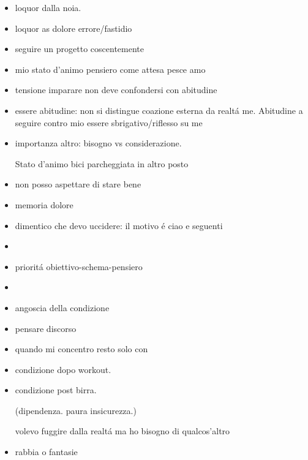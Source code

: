 \begin{itemize}
\item loquor dalla noia. 

\item loquor as dolore errore/fastidio

\item seguire un progetto coscentemente

\item mio stato d'animo pensiero come attesa pesce amo

\item tensione imparare non deve confondersi con abitudine

\item essere abitudine: non si distingue coazione esterna da realt\'a me. Abitudine a seguire contro mio essere sbrigativo/riflesso su me

\item importanza altro: bisogno vs considerazione.

Stato d'animo bici parcheggiata in altro posto

\item non posso aspettare di stare bene

\item memoria dolore

\item dimentico che devo uccidere: il motivo \'e ciao e seguenti

\item {}
\item priorit\'a obiettivo-schema-pensiero
\item {}

\item angoscia della condizione

\item pensare discorso

\item quando mi concentro resto solo con 

\item condizione dopo workout.

\item condizione post birra.

(dipendenza. paura insicurezza.)

volevo fuggire dalla realt\'a ma ho bisogno di qualcos'altro

\item rabbia o fantasie


\end{itemize}
